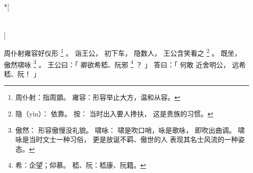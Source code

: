 
\switchcolumn[0]*[\section{}]

周仆射雍容好仪形%
\footnote{%
    周仆射：指周顗。
    雍容：形容举止大方，温和从容。
}%
。
诣王公，
初下车，
隐数人，
王公含笑看之%
\footnote{%
    隐（yìn）：
        依靠。
        按：
        当时出入要人搀扶，
        这是贵族的习惯。
}%
。
既坐，
傲然啸咏%
\footnote{%
    傲然：
        形容傲慢没礼貌。
    啸咏：
        啸是吹口哨，咏是歌咏，
        即吹出曲调。
        啸咏是当时文士一种习俗，
        更是放诞不羁、傲世的人
        表现其名士风流的一种姿态。
}%
。
王公曰：「
    卿欲希嵇、阮邪%
    \footnote{%
        希：企望；仰慕。
        嵇、阮：嵇康、阮籍。
    }%
    ？
」
答曰：「
    何敢
    近舍明公，
    远希嵇、阮！
」

\switchcolumn


